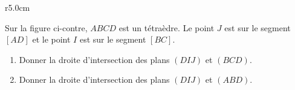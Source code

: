 
\begin{exercice}\label{exosmath-0567}

\begin{wrapfigure}{r}{5.0cm}
   \vspace{-1cm}        %
   \centering
   
\end{wrapfigure}

Sur la figure ci-contre, \( ABCD\) est un tétraèdre. Le point \( J\) est sur le segment \( [AD]\) et le point \( I\) est sur le segment \( [BC]\).
\begin{enumerate}
    \item
        Donner la droite d'intersection des plans \( (DIJ)\) et \( (BCD)\).
    \item
        Donner la droite d'intersection des plans \( (DIJ)\) et \( (ABD)\).
\end{enumerate}

\end{exercice}
